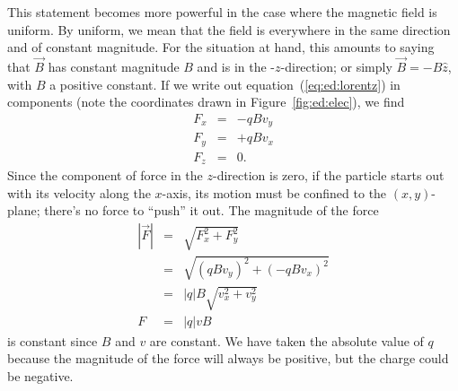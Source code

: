 This statement becomes more powerful in the case where the magnetic field is
uniform. By uniform, we mean that the field is everywhere in the same 
direction and of constant magnitude.  For the situation at hand, this
amounts to saying that $\vec{B}$ has constant magnitude $B$ and is in the 
-$z$-direction; or simply $\vec{B}=-B\hat{z}$, with $B$ a positive constant. 
If we write out equation~(\ref{eq:ed:lorentz}) in components (note the 
coordinates drawn in Figure~\ref{fig:ed:elec}), we find
\begin{eqnarray*}
F_x &=& -q B v_y \nonumber \\
F_y &=& +q B v_x \\
F_z &=& 0. \nonumber
\end{eqnarray*}
Since the component of force in the $z$-direction is zero, if the particle
starts out with its velocity along the $x$-axis, its motion must be confined
to the $(x,y)$-plane; there's no force to ``push'' it out. The magnitude of
the force
\begin{eqnarray}
|\vec{F}| &=& \sqrt{F_x^2 + F_y^2} \nonumber \\
&=& \sqrt{ \left(qBv_y\right)^2 +  \left(-qBv_x\right)^2 } \nonumber \\
&=& |q|B \sqrt{v_x^2+v_y^2} \nonumber \\
F &=& |q|vB \label{eq:ed:constF}
\end{eqnarray}
is constant since $B$ and $v$ are constant. We have taken the absolute value
of $q$ because the magnitude of the force will always be positive, but the 
charge could be negative. 

